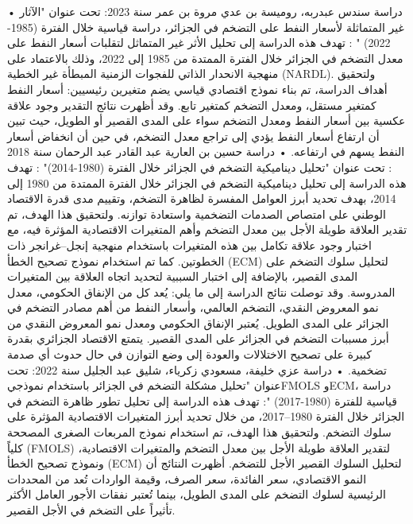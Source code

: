 \documentclass[12pt,a4paper]{report}
\begin{document}
• دراسة سندس عبدربه، روميسة بن عدي مروة بن عمر سنة 2023: تحت عنوان "الآثار غير المتماثلة لأسعار النفط على التضخم في الجزائر، دراسة قياسية خلال الفترة (1985-2022) " : تهدف هذه الدراسة إلى تحليل الأثر غير المتماثل لتقلبات أسعار النفط على معدل التضخم في الجزائر خلال الفترة الممتدة من 1985 إلى 2022، وذلك بالاعتماد على منهجية الانحدار الذاتي للفجوات الزمنية المبطأة غير الخطية (NARDL). ولتحقيق أهداف الدراسة، تم بناء نموذج اقتصادي قياسي يضم متغيرين رئيسيين: أسعار النفط كمتغير مستقل، ومعدل التضخم كمتغير تابع.
وقد أظهرت نتائج التقدير وجود علاقة عكسية بين أسعار النفط ومعدل التضخم سواء على المدى القصير أو الطويل، حيث تبين أن ارتفاع أسعار النفط يؤدي إلى تراجع معدل التضخم، في حين أن انخفاض أسعار النفط يسهم في ارتفاعه. 
• دراسة حسين بن العارية عبد القادر عبد الرحمان سنة 2018 : تحت عنوان "تحليل ديناميكية التضخم في الجزائر خلال الفترة (1980-2014)" : تهدف هذه الدراسة إلى تحليل ديناميكية التضخم في الجزائر خلال الفترة الممتدة من 1980 إلى 2014، بهدف تحديد أبرز العوامل المفسرة لظاهرة التضخم، وتقييم مدى قدرة الاقتصاد الوطني على امتصاص الصدمات التضخمية واستعادة توازنه. ولتحقيق هذا الهدف، تم تقدير العلاقة طويلة الأجل بين معدل التضخم وأهم المتغيرات الاقتصادية المؤثرة فيه، مع اختبار وجود علاقة تكامل بين هذه المتغيرات باستخدام منهجية إنجل–غرانجر ذات الخطوتين. كما تم استخدام نموذج تصحيح الخطأ (ECM) لتحليل سلوك التضخم على المدى القصير، بالإضافة إلى اختبار السببية لتحديد اتجاه العلاقة بين المتغيرات المدروسة.
وقد توصلت نتائج الدراسة إلى ما يلي:
يُعد كل من الإنفاق الحكومي، معدل نمو المعروض النقدي، التضخم العالمي، وأسعار النفط من أهم مصادر التضخم في الجزائر على المدى الطويل.
يُعتبر الإنفاق الحكومي ومعدل نمو المعروض النقدي من أبرز مسببات التضخم في الجزائر على المدى القصير.
يتمتع الاقتصاد الجزائري بقدرة كبيرة على تصحيح الاختلالات والعودة إلى وضع التوازن في حال حدوث أي صدمة تضخمية.
• دراسة عزي خليفة، مسعودي زكرياء، شليق عبد الجليل سنة 2022: تحت عنوان "تحليل مشكلة التضخم في الجزائر باستخدام نموذجيFMOLS وECM، دراسة قياسية للفترة (1980-2017) ": تهدف هذه الدراسة إلى تحليل تطور ظاهرة التضخم في الجزائر خلال الفترة 1980–2017، من خلال تحديد أبرز المتغيرات الاقتصادية المؤثرة على سلوك التضخم. ولتحقيق هذا الهدف، تم استخدام نموذج المربعات الصغرى المصححة كلياً (FMOLS) لتقدير العلاقة طويلة الأجل بين معدل التضخم والمتغيرات الاقتصادية، ونموذج تصحيح الخطأ (ECM) لتحليل السلوك القصير الأجل للتضخم.
 أظهرت النتائج أن النمو الاقتصادي، سعر الفائدة، سعر الصرف، وقيمة الواردات تُعد من المحددات الرئيسية لسلوك التضخم على المدى الطويل، بينما تُعتبر نفقات الأجور العامل الأكثر تأثيراً على التضخم في الأجل 
القصير.
\end{document}
